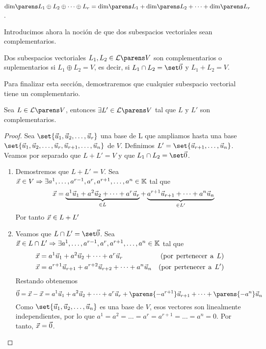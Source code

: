 \documentclass[../algebra_lineal.tex]{subfiles}
\begin{document}
\begin{corollary}
    $\dim{\pdlst{L}{r}{\oplus}} = \dim{L_1} + \dim{L_2} + \dots + \dim{L_r}$.
\end{corollary}

Introducimos ahora la noción de que dos subespacios vectoriales sean complementarios.

\begin{definition}
    Dos subespacios vectoriales $L_1, L_2 \in \subespaciosde{V}$ son complementarios o suplementarios si $L_1 \oplus L_2 = V$, es decir, si $\zvsint{L_1}{L_2}$ y $L_1 + L_2 = V$.
\end{definition}

Para finalizar esta sección, demostraremos que cualquier subespacio vectorial tiene un complementario.

\begin{proposition}
    Sea $L \in \subespaciosde{V}$, entonces $\exists L' \in \subespaciosde{V}$ tal que $L$ y $L'$ son complementarios.
\end{proposition}

\begin{proof}
    Sea $\set{\vlst{u}{r}}$ una base de L que ampliamos hasta una base $\set{\vlst{u}{r}, \vu_{r+1}, \dots, \vu_n}$ de $V$. Definimos $L'= \set{\vu_{r+1}, \dots, \vu_n}$. Veamos por separado que $L+L'=V$ y que $L_1 \cap L_2 = \zvs$.

    \begin{enumerate}
        \item Demostremos que $L+L'=V$. Sea $\vx \in V \Rightarrow \exists \cslst{a}{n}{r} \in \K$ tal que
        \[
            \vx = \underbrace{ \lincomb{a}{u}{r} }_{\in L} + \underbrace{a^{r+1}\vu_{r+1} + \dots + a^{n}\vu_{n} }_{\in L'}
        \]
        Por tanto $\vx \in L + L'$
        \item Veamos que $L \cap L' = \zvs$. Sea $\vx \in L \cap L' \Rightarrow \exists \cslst{a}{n}{r} \in \K$ tal que
        \begin{align*}
            \vx &= \lincomb{a}{u}{r}  & (\mathrm{por \spc pertenecer \spc a \spc} L) \\ 
            \vx &= a^{r+1}\vu_{r+1} + a^{r+2}\vu_{r+2} + \dots + a^n \vu_{n} &(\mathrm{por \spc pertenecer \spc a \spc} L') &
        \end{align*}
        Restando obtenemos
        \[
            \zv = \vx - \vx = \lincomb{a}{u}{r} + \parens{-a^{r+1}}\vu_{r+1} + \dots + \parens{-a^n}\vu_n 
        \]
        Como $\set{\vlst{u}{n}}$ es una base de $V$, esos vectores son linealmente independientes, por lo que $a^1=a^2=\dots=a^r=a^{r+1}=\dots=a^n=0$. Por tanto, $\vx = \zv$.
    \end{enumerate}
\end{proof}
\end{document}
